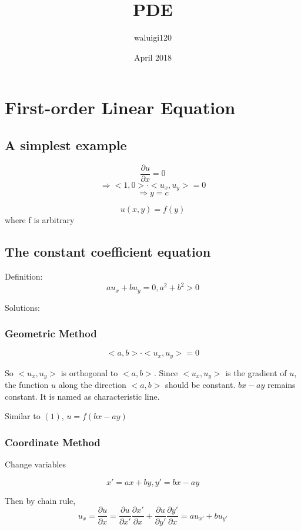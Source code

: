 \documentclass{article}
\title{PDE}
\author{waluigi120 }
\date{April 2018}
\begin{document}
\maketitle

\section{First-order Linear Equation}

\subsection{A simplest example}
$$\frac {\partial u} {\partial x} = 0$$
$$\Rightarrow <1,0> \cdot <u_x,u_y> = 0$$
$$\Rightarrow y = c$$

\begin{equation}\label{eq1}
u(x,y) = f(y)
\end{equation}
where f is arbitrary


\subsection{The constant coefficient equation}

Definition:
$$au_x+bu_y=0, a^2+b^2 > 0$$

Solutions:

\subsubsection{Geometric Method}

$$<a,b> \cdot <u_x,u_y> = 0$$

So $<u_x,u_y>$ is orthogonal to $<a,b>$. Since $<u_x,u_y>$ is the gradient of $u$, the function $u$ along the direction $<a,b>$ should be constant.  $bx-ay$ remains constant. It is named as characteristic line.

Similar to $(1)$, $u = f(bx-ay)$

\subsubsection{Coordinate Method}

Change variables 

\begin{equation} 
 x' = ax+by, y' = bx-ay
\end{equation}

Then by chain rule,
$$u_x = \frac{\partial u}{\partial x} = \frac{\partial u}{\partial x'} \frac{\partial x'} {\partial x} + \frac{\partial u}{\partial y'} \frac{\partial y'} {\partial x}  = a u_{x'} + b u_{y'}$$
\end{document}
